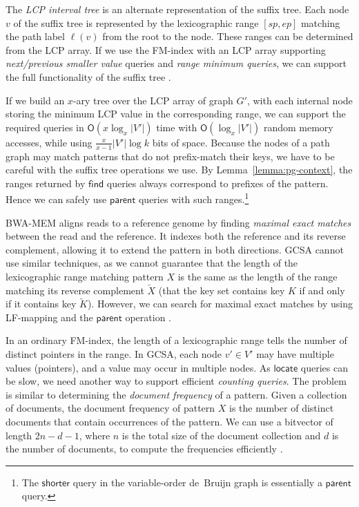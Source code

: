 \documentclass[twoside,leqno,twocolumn]{article}
\newcommand{\abs}[1]{\ensuremath{\lvert #1 \rvert}}
\newcommand{\Oh}[1]{\ensuremath{\mathsf{O}\!\left( #1 \right)}}
\newcommand{\revcomp}[1]{\ensuremath{\overleftarrow{#1}}}
\newcommand{\find}{\ensuremath{\mathsf{find}}}
\newcommand{\locate}{\ensuremath{\mathsf{locate}}}
\newcommand{\parent}{\ensuremath{\mathsf{parent}}}
\newcommand{\LFmapping}{LF\nobreakdash-mapping}
\begin{document}
The \emph{LCP interval tree} \cite{Abouelhoda2004} is an alternate representation of the suffix tree. Each node $v$ of the suffix tree is represented by the lexicographic range $[sp, ep]$ matching the path label $\ell(v)$ from the root to the node. These ranges can be determined from the LCP array. If we use the FM\nobreakdash-index with an LCP array supporting \emph{next/previous smaller value} queries and \emph{range minimum queries}, we can support the full functionality of the suffix tree \cite{Fischer2009a}.

If we build an $x$\nobreakdash-ary tree over the LCP array of graph $G'$, with each internal node storing the minimum LCP value in the corresponding range, we can support the required queries in $\Oh{x \log_{x} \abs{V'}}$ time with $\Oh{\log_{x} \abs{V'}}$ random memory accesses, while using $\frac{x}{x-1} \abs{V'} \log k$ bits of space. Because the nodes of a path graph may match patterns that do not prefix-match their keys, we have to be careful with the suffix tree operations we use. By Lemma~\ref{lemma:pg-context}, the ranges returned by $\find$ queries always correspond to prefixes of the pattern. Hence we can safely use $\parent$ queries with such ranges.\footnote{The $\textsf{shorter}$ query in the variable-order de~Bruijn graph \cite{Boucher2014} is essentially a $\parent$ query.}

BWA-MEM \cite{Li2013} aligns reads to a reference genome by finding \emph{maximal exact matches} between the read and the reference. It indexes both the reference and its reverse complement, allowing it to extend the pattern in both directions. GCSA cannot use similar techniques, as we cannot guarantee that the length of the lexicographic range matching pattern $X$ is the same as the length of the range matching its reverse complement $\revcomp{X}$ (that the key set contains key $K$ if and only if it contains key $\revcomp{K}$). However, we can search for maximal exact matches by using \LFmapping{} and the $\parent$ operation \cite{Ohlebusch2010a}.

In an ordinary FM\nobreakdash-index, the length of a lexicographic range tells the number of distinct pointers in the range. In GCSA, each node $v' \in V'$ may have multiple values (pointers), and a value may occur in multiple nodes. As $\locate$ queries can be slow, we need another way to support efficient \emph{counting queries}. The problem is similar to determining the \emph{document frequency} of a pattern. Given a collection of documents, the document frequency of pattern $X$ is the number of distinct documents that contain occurrences of the pattern. We can use a bitvector of length $2n-d-1$, where $n$ is the total size of the document collection and $d$ is the number of documents, to compute the frequencies efficiently \cite{Sadakane2007a}.
\end{document}
